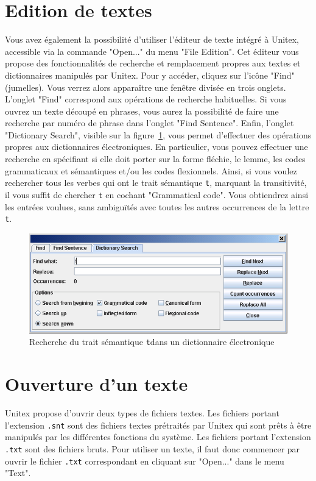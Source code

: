 \section{Edition de textes}
Vous avez également la possibilité d’utiliser l’éditeur de texte intégré à Unitex, accessible
via la commande "Open..." du menu "File Edition". Cet éditeur vous propose des fonctionnalités
de recherche et remplacement propres aux textes et dictionnaires manipulés par Unitex. Pour y
accéder, cliquez sur l’icône "Find" (jumelles). Vous verrez alors apparaître une fenêtre divisée en
trois onglets. L’onglet "Find" correspond aux opérations de recherche habituelles. Si vous ouvrez un
texte découpé en phrases, vous aurez la possibilité de faire une recherche par numéro de phrase dans
l’onglet "Find Sentence". Enfin, l’onglet "Dictionary Search", visible sur la
figure~\ref{dictionary-search}, vous permet d’effectuer des opérations propres aux dictionnaires
électroniques. En particulier, vous pouvez effectuer une recherche en spécifiant si elle doit porter
sur la forme fléchie, le lemme, les codes grammaticaux et sémantiques et/ou les codes flexionnels.
Ainsi, si vous voulez rechercher tous les verbes qui ont le trait sémantique
\verb$t$, marquant la transitivité, il vous suffit de chercher \verb$t$ en cochant
"Grammatical code". Vous obtiendrez ainsi les entrées voulues, sans ambiguïtés avec toutes les
autres occurrences de la lettre \verb$t$.


\begin{figure}[!h]
\begin{center}
\includegraphics[width=15cm]{resources/img/fig2-6.png}
\caption{Recherche du trait sémantique \texttt{t}dans un dictionnaire
électronique\label{dictionary-search}}
\end{center}
\end{figure}


\section{Ouverture d’un texte}
\noindent Unitex propose d’ouvrir deux types de fichiers textes. 
Les fichiers portant l’extension \verb+.snt+ sont des fichiers textes prétraités 
par Unitex qui sont prêts à être manipulés par les différentes fonctions du système.
Les fichiers portant l’extension \verb+.txt+ sont des fichiers bruts.
Pour utiliser un texte, il faut donc commencer par ouvrir le fichier  \verb+.txt+
correspondant en cliquant sur "Open..." dans le menu "Text".


